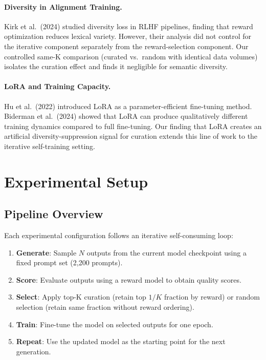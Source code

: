 \documentclass[11pt,a4paper]{article}
\begin{document}
\paragraph{Diversity in Alignment Training.}
Kirk et al.\ (2024) studied diversity loss in RLHF pipelines, finding that reward optimization reduces lexical variety. However, their analysis did not control for the iterative component separately from the reward-selection component. Our controlled same-K comparison (curated vs.\ random with identical data volumes) isolates the curation effect and finds it negligible for semantic diversity.

\paragraph{LoRA and Training Capacity.}
Hu et al.\ (2022) introduced LoRA as a parameter-efficient fine-tuning method. Biderman et al.\ (2024) showed that LoRA can produce qualitatively different training dynamics compared to full fine-tuning. Our finding that LoRA creates an artificial diversity-suppression signal for curation extends this line of work to the iterative self-training setting.

\section{Experimental Setup}

\subsection{Pipeline Overview}

Each experimental configuration follows an iterative self-consuming loop:
\begin{enumerate}
    \item \textbf{Generate}: Sample $N$ outputs from the current model checkpoint using a fixed prompt set (2,200 prompts).
    \item \textbf{Score}: Evaluate outputs using a reward model to obtain quality scores.
    \item \textbf{Select}: Apply top-K curation (retain top $1/K$ fraction by reward) or random selection (retain same fraction without reward ordering).
    \item \textbf{Train}: Fine-tune the model on selected outputs for one epoch.
    \item \textbf{Repeat}: Use the updated model as the starting point for the next generation.
\end{enumerate}
\end{document}
